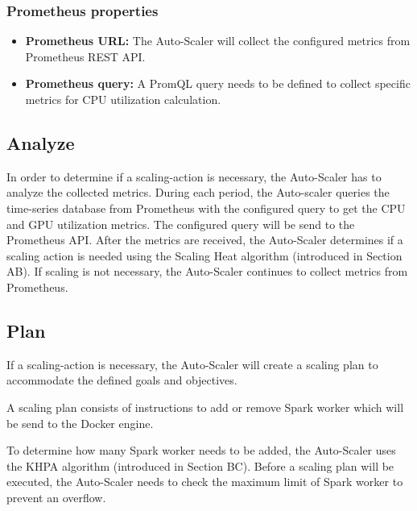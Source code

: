 \subsubsection{Prometheus properties}

\begin{itemize}
\item \textbf{Prometheus URL:} The Auto-Scaler will collect the configured metrics from Prometheus REST API.

\item \textbf{Prometheus query:} A PromQL query needs to be defined to collect specific metrics for CPU utilization calculation. 
\end{itemize}


\subsection{Analyze}
In order to determine if a scaling-action is necessary, the Auto-Scaler has to analyze the collected metrics. 
During each period, the Auto-scaler queries the time-series database from Prometheus with the configured query to get the CPU and GPU utilization metrics. The configured query will be send to the Prometheus API.
After the metrics are received, the Auto-Scaler determines if a scaling action is needed using the Scaling Heat algorithm (introduced in Section AB). If scaling is not necessary, the Auto-Scaler continues to collect metrics from Prometheus.

\subsection{Plan}
If a scaling-action is necessary, the Auto-Scaler will create a scaling plan to accommodate the defined goals and objectives.

A scaling plan consists of instructions to add or remove Spark worker which will be send to the Docker engine.

To determine how many Spark worker needs to be added, the Auto-Scaler uses the KHPA algorithm (introduced in Section BC). Before a scaling plan will be executed, the Auto-Scaler needs to check the maximum limit of Spark worker to prevent an overflow.


